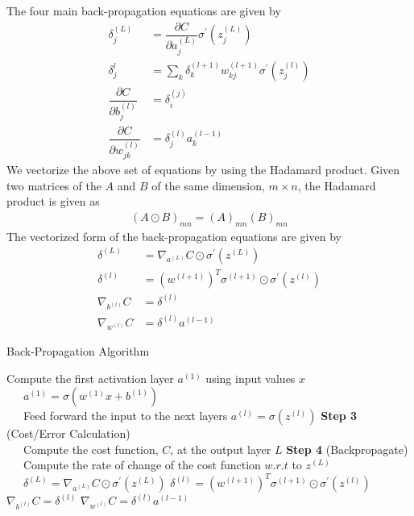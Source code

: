 The four main back-propagation equations are given by 
\begin{align}
  \delta_j^{(L)} &= \dfrac{\partial C }{\partial a_j^{(L)}} \sigma^{'}(z_j^{(L)}) \\
  \delta_j^l &= \sum_k \delta_k^{(l+1)} w_{kj}^{(l+1)} \sigma^{'}(z_j^{(l)})\\
  \dfrac{\partial C}{\partial b_j^{(l)}} &= \delta_i^{(j)} \\
  \dfrac{\partial C}{\partial w_{jk}^{(l)}} &= \delta_j^{(l)}a_k^{(l-1)}
\end{align}
We vectorize the above set of equations by using the Hadamard product. Given two matrices of the $A$ and $B$ of the same dimension, $m \times n$, the Hadamard product is given as
\begin{align*}
  (A \odot B)_{mn} = (A)_{mn} (B)_{mn} 
\end{align*}
The vectorized form of the back-propagation equations are given by 
\begin{align}
  \delta^{(L)} &= \nabla_{a^{(L)}}C \odot \sigma^{'}(z^{(L)}) \\
  \delta^{(l)} &= (w^{(l+1)})^T\sigma^{(l+1)} \odot \sigma^{'}(z^{(l)}) \\
  \nabla_{b^{(l)}} C &= \delta^{(l)} \\
  \nabla_{w^{(l)}} C &= \delta^{(l)}a^{(l-1)}
\end{align}
\begin{algorithm}[H]
  \caption{Back-Propagation Algorithm}\label{alg:back_propagation_algo}
  \begin{algorithmic}[1]
  Compute the first activation layer $a^{(1)}$ using input values $x$ \\
  \, \, \, $a^{(1)} = \sigma(w^{(1)}x + b^{(1)} )$
  \\
  \, \, \, Feed forward the input to the next layers
    \State $a^{(l)} = \sigma(z^{(l)})$
  \EndFor  
  \State \textbf{Step 3} (Cost/Error Calculation)\\
  \, \, \, Compute the cost function, $C$, at the output layer $L$
  \State \textbf{Step 4} (Backpropagate) \\
  \, \, \, Compute the rate of change of the cost function $w.r.t$ to $z^{(L)}$\\
  \, \, \,  $\delta^{(L)} = \nabla_{a^{(L)}}C \odot \sigma^{'}(z^{(L)})$
    \State $\delta^{(l)} = (w^{(l+1)})^T\sigma^{(l+1)} \odot \sigma^{'}(z^{(l)})$
    \State $\nabla_{b^{(l)}} C = \delta^{(l)}$
    \State $\nabla_{w^{(l)}} C = \delta^{(l)}a^{(l-1)}$
  \EndFor
\end{algorithmic}
\end{algorithm}
